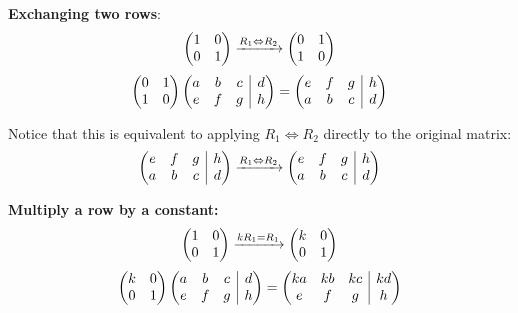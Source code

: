 \documentclass{article}
\begin{document}
\newline
\par \noindent \textbf{Exchanging two rows}: 
\[
 \left(\begin{array}{@{}cc@{}}
	1 & 0 \\
	0 & 1 
\end{array}\right)
 \xrightarrow[]{R_1 \Leftrightarrow R_2}
  \left(\begin{array}{@{}cc@{}}
	0 & 1 \\
	1 & 0 
\end{array}\right)
 \]
 \[
   \left(\begin{array}{@{}cc@{}}
	0 & 1 \\
	1 & 0 
\end{array}\right)
\left(\begin{array}{@{}ccc|c@{}}
	a & b & c & d \\
	e & f & g & h
\end{array}\right)=
\left(\begin{array}{@{}ccc|c@{}}
	e & f & g & h \\
	a & b & c & d
\end{array}\right)
\]
\par \noindent Notice that this is equivalent to applying \(R_1 \Leftrightarrow R_2\) directly to the original matrix:
\newline
\[
\left(\begin{array}{@{}ccc|c@{}}
	e & f & g & h \\
	a & b & c & d
\end{array}\right)
 \xrightarrow[]{R_1 \Leftrightarrow R_2}
 \left(\begin{array}{@{}ccc|c@{}}
	e & f & g & h \\
	a & b & c & d
\end{array}\right)
\]
\par \noindent \textbf{Multiply a row by a constant:}
\newline
\[
 \left(\begin{array}{@{}cc@{}}
	1 & 0 \\
	0 & 1 
\end{array}\right)
 \xrightarrow[]{kR_1 = R_1}
  \left(\begin{array}{@{}cc@{}}
	k & 0 \\
	0 & 1 
\end{array}\right)
 \]
 \[
   \left(\begin{array}{@{}cc@{}}
	k & 0 \\
	0 & 1 
\end{array}\right)
\left(\begin{array}{@{}ccc|c@{}}
	a & b & c & d \\
	e & f & g & h
\end{array}\right)=
\left(\begin{array}{@{}ccc|c@{}}
	ka & kb & kc & kd \\
	e & f & g & h
\end{array}\right)
\]
\end{document}
